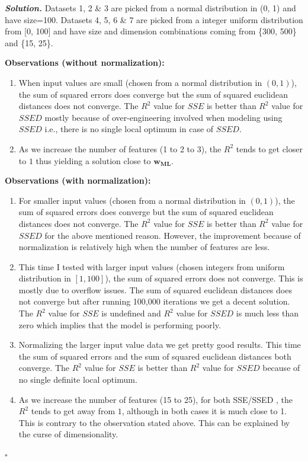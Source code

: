 \documentclass[8pt]{article}
\newenvironment{solution}[1][\it{Solution}]{\textbf{#1. } }{$\square$}
\begin{document}
\begin{solution}
Datasets 1, 2 \& 3 are picked from a normal distribution in (0, 1) and have size=100. Datasets 4, 5, 6 \& 7 are picked from a integer uniform distribution from [0, 100] and have size and dimension combinations coming from \{300, 500\} and \{15, 25\}.

\textbf{Observations (without normalization):}\\
\begin{enumerate}
\item When input values are small (chosen from a normal distribution in $(0, 1)$), the sum of squared errors does converge but the sum of squared euclidean distances does not converge. The $R^{2}$ value for $SSE$ is better than $R^{2}$ value for $SSED$ mostly because of over-engineering involved when modeling using $SSED$ i.e., there is no single local optimum in case of $SSED$.
\item As we increase the number of features (1 to 2 to 3), the $R^{2}$ tends to get closer to $1$ thus yielding a solution close to $\mathbf{w_{ML}}$.
\end{enumerate}


\textbf{Observations (with normalization):}\\
\begin{enumerate}
\item For smaller input values (chosen from a normal distribution in $(0, 1)$), the sum of squared errors does converge but the sum of squared euclidean distances does not converge. The $R^{2}$ value for $SSE$ is better than $R^{2}$ value for $SSED$ for the above mentioned reason. However, the improvement because of normalization is relatively high when the number of features are less. 
\item This time I tested with larger input values (chosen integers from uniform distribution in $[1, 100]$), the sum of squared errors does not converge. This is mostly due to overflow issues. The sum of squared euclidean distances does not converge but after running 100,000 iterations we get a decent solution. The $R^{2}$ value for $SSE$ is undefined and $R^{2}$ value for $SSED$ is much less than zero which implies that the model is performing poorly.
\item Normalizing the larger input value data we get pretty good results. This time the sum of squared errors and the sum of squared euclidean distances both converge. The $R^{2}$ value for $SSE$ is better than $R^{2}$ value for $SSED$ because of no single definite local optimum.
\item As we increase the number of features (15 to 25), for both SSE/SSED , the $R^{2}$ tends to get away from $1$, although in both cases it is much close to 1. This is contrary to the observation stated above. This can be explained by the curse of dimensionality.
\end{enumerate}


\end{solution}
\end{document}
